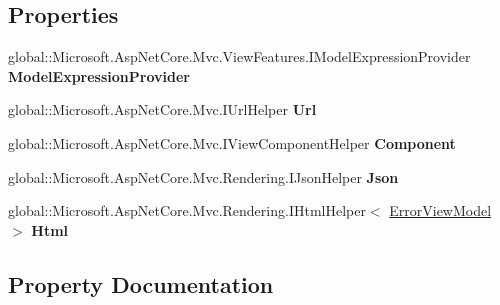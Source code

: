 \subsection*{Properties}
\begin{DoxyCompactItemize}
\item 
global\+::\+Microsoft.\+Asp\+Net\+Core.\+Mvc.\+View\+Features.\+I\+Model\+Expression\+Provider {\bfseries Model\+Expression\+Provider}
\item 
\mbox{\label{class_asp_net_core_1_1_views___shared___error_a4ba8fd3144f817b5d528aad8f167e9c5}} 
global\+::\+Microsoft.\+Asp\+Net\+Core.\+Mvc.\+I\+Url\+Helper {\bfseries Url}
\item 
\mbox{\label{class_asp_net_core_1_1_views___shared___error_a57315f823a6bb1d70d3b158f657280cc}} 
global\+::\+Microsoft.\+Asp\+Net\+Core.\+Mvc.\+I\+View\+Component\+Helper {\bfseries Component}
\item 
\mbox{\label{class_asp_net_core_1_1_views___shared___error_a55877c394ba98aa0614b60570746d115}} 
global\+::\+Microsoft.\+Asp\+Net\+Core.\+Mvc.\+Rendering.\+I\+Json\+Helper {\bfseries Json}
\item 
\mbox{\label{class_asp_net_core_1_1_views___shared___error_ab9fe3921f4e310c9fa95483790234b9b}} 
global\+::\+Microsoft.\+Asp\+Net\+Core.\+Mvc.\+Rendering.\+I\+Html\+Helper$<$ \mbox{\hyperlink{class_projeto_e_s_w_1_1_models_1_1_error_view_model}{Error\+View\+Model}} $>$ {\bfseries Html}
\end{DoxyCompactItemize}


\subsection{Property Documentation}
\mbox{\label{class_asp_net_core_1_1_views___shared___error_a5ae6043cefa65f20001cd41c15901a23}} 
